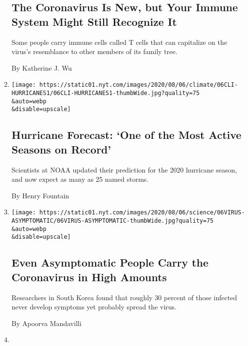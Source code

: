 \begin{enumerate}
{  \subsection{The Coronavirus Is New, but Your Immune System Might Still
  Recognize
  It}\label{the-coronavirus-is-new-but-your-immune-system-might-still-recognize-it}}

  Some people carry immune cells called T cells that can capitalize on
  the virus's resemblance to other members of its family tree.

  By Katherine J. Wu
\item
  \href{/2020/08/06/climate/hurricanes-noaa-prediction.html}{}

  \texttt{[image: https://static01.nyt.com/images/2020/08/06/climate/06CLI-HURRICANES1/06CLI-HURRICANES1-thumbWide.jpg?quality=75\\\&auto=webp\\\&disable=upscale]}

  \hypertarget{hurricane-forecast-one-of-the-most-active-seasons-on-record}{%
  \subsection{Hurricane Forecast: `One of the Most Active Seasons on
  Record'}\label{hurricane-forecast-one-of-the-most-active-seasons-on-record}}

  Scientists at NOAA updated their prediction for the 2020 hurricane
  season, and now expect as many as 25 named storms.

  By Henry Fountain
\item
  \href{/2020/08/06/health/coronavirus-asymptomatic-transmission.html}{}

  \texttt{[image: https://static01.nyt.com/images/2020/08/06/science/06VIRUS-ASYMPTOMATIC/06VIRUS-ASYMPTOMATIC-thumbWide.jpg?quality=75\\\&auto=webp\\\&disable=upscale]}

  \hypertarget{even-asymptomatic-people-carry-the-coronavirus-in-high-amounts}{%
  \subsection{Even Asymptomatic People Carry the Coronavirus in High
  Amounts}\label{even-asymptomatic-people-carry-the-coronavirus-in-high-amounts}}

  Researchers in South Korea found that roughly 30 percent of those
  infected never develop symptoms yet probably spread the virus.

  By Apoorva Mandavilli
\item
  \href{/2020/08/06/world/coronavirus-covid.html}{}


\end{enumerate}
